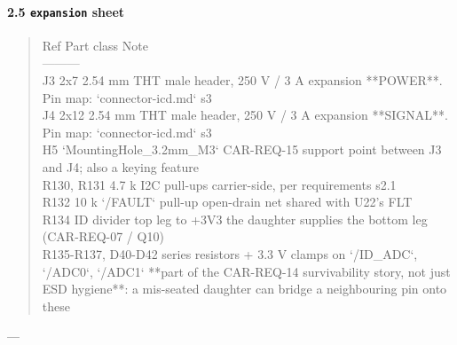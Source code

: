 \documentclass[11pt,a4paper]{article}
\begin{document}
\paragraph*{2.5 \texttt{expansion} sheet}
\begin{quote}\small\ttfamily\raggedright
\textbar{} Ref \textbar{} Part class \textbar{} Note \textbar{}\\
\textbar{}---\textbar{}---\textbar{}---\textbar{}\\
\textbar{} J3 \textbar{} 2x7 2.54 mm THT male header, 250 V / 3 A \textbar{} expansion {*}{*}POWER{*}{*}. Pin map: `connector-icd.md` s3 \textbar{}\\
\textbar{} J4 \textbar{} 2x12 2.54 mm THT male header, 250 V / 3 A \textbar{} expansion {*}{*}SIGNAL{*}{*}. Pin map: `connector-icd.md` s3 \textbar{}\\
\textbar{} H5 \textbar{} `MountingHole\_3.2mm\_M3` \textbar{} CAR-REQ-15 support point between J3 and J4; also a keying feature \textbar{}\\
\textbar{} R130, R131 \textbar{} 4.7 k I2C pull-ups \textbar{} carrier-side, per requirements s2.1 \textbar{}\\
\textbar{} R132 \textbar{} 10 k `/FAULT` pull-up \textbar{} open-drain net shared with U22's FLT \textbar{}\\
\textbar{} R134 \textbar{} ID divider top leg to +3V3 \textbar{} the daughter supplies the bottom leg (CAR-REQ-07 / Q10) \textbar{}\\
\textbar{} R135-R137, D40-D42 \textbar{} series resistors + 3.3 V clamps on `/ID\_ADC`, `/ADC0`, `/ADC1` \textbar{} {*}{*}part of the CAR-REQ-14 survivability story, not just ESD hygiene{*}{*}: a mis-seated daughter can bridge a neighbouring pin onto these \textbar{}
\end{quote}
---
\end{document}
